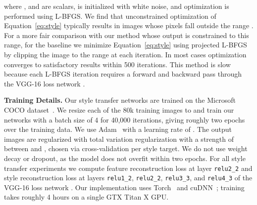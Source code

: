 \documentclass[runningheads]{llncs}
\begin{document}
where , and  are scalars,  is initialized with white
noise, and optimization is performed using L-BFGS. We find that unconstrained optimization of
Equation~\ref{eq:style} typically results in images whose pixels fall outside the range
. For a more fair comparison with our method whose output is constrained to this
range, for the baseline we minimize Equation~\ref{eq:style} using projected L-BFGS by
clipping the image  to the range  at each iteration. In most cases optimization
converges to satisfactory results within 500 iterations. This method is slow because each
L-BFGS iteration requires a forward and backward pass through the VGG-16 loss network . 

\vspace{1mm}
\noindent \textbf{Training Details.}
Our style transfer networks are trained on the Microsoft COCO dataset~\cite{lin2014microsoft}.
We resize each of the 80k training images to  and train our networks with
a batch size of 4 for 40,000 iterations, giving roughly two epochs over the training data.
We use Adam~\cite{kingma2014adam} with a learning rate of . The output images
are regularized with total variation regularization with a strength of between 
and , chosen via cross-validation per style target. We do not use weight decay
or dropout, as the model does not overfit within two epochs. For all style transfer experiments
we compute feature reconstruction loss at layer \verb.relu2_2. and style reconstruction
loss at layers \verb.relu1_2., \verb.relu2_2., \verb.relu3_3., and \verb.relu4_3. of the
VGG-16 loss network .
Our implementation uses Torch~\cite{collobert2011torch7} and cuDNN~\cite{chetlur2014cudnn};
training takes roughly 4 hours on a single GTX Titan X GPU. 
\end{document}
